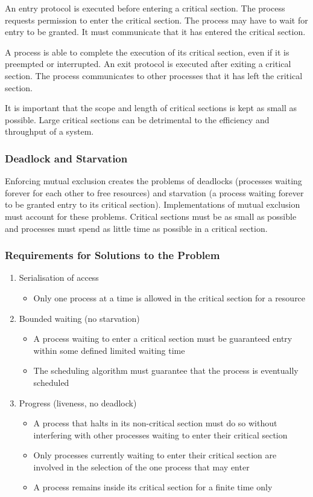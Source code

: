 An entry protocol is executed before entering a critical section.
The process requests permission to enter the critical section.
The process may have to wait for entry to be granted.
It must communicate that it has entered the critical section.

A process is able to complete the execution of its critical section, even if it is preempted or interrupted.
An exit protocol is executed after exiting a critical section.
The process communicates to other processes that it has left the critical section.

It is important that the scope and length of critical sections is kept as small as possible.
Large critical sections can be detrimental to the efficiency and throughput of a system.

\subsubsection{Deadlock and Starvation}

Enforcing mutual exclusion creates the problems of deadlocks (processes waiting forever for each other to free resources) and starvation (a process waiting forever to be granted entry to its critical section).
Implementations of mutual exclusion must account for these problems.
Critical sections must be as small as possible and processes must spend as little time as possible in a critical section.

\subsubsection{Requirements for Solutions to the Problem}

\begin{enumerate}
  \item Serialisation of access
  \begin{itemize}
    \item Only one process at a time is allowed in the critical section for a resource
  \end{itemize}
  \item Bounded waiting (no starvation)
  \begin{itemize}
    \item A process waiting to enter a critical section must be guaranteed entry within some defined limited waiting time
    \item The scheduling algorithm must guarantee that the process is eventually scheduled
  \end{itemize}
  \item Progress (liveness, no deadlock)
  \begin{itemize}
    \item A process that halts in its non-critical section must do so without interfering with other processes waiting to enter their critical section
    \item Only processes currently waiting to enter their critical section are involved in the selection of the one process that may enter
    \item A process remains inside its critical section for a finite time only
  \end{itemize}
\end{enumerate}

